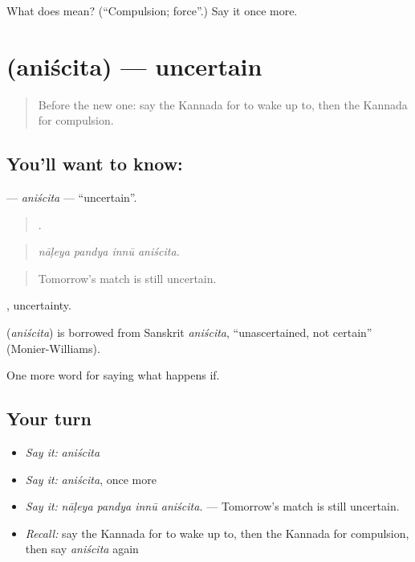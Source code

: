 \begin{tcolorbox}[breakable,colback=teal!4,colframe=teal!35!black,title={Before you move on}]
What does  mean? (\textquotedblleft{}Compulsion; force\textquotedblright{}.) Say it once more.
\end{tcolorbox}
\section[\texorpdfstring{\kn{ಅನಿಶ್ಚಿತ} (aniścita)}{ಅನಿಶ್ಚಿತ (aniścita)}]{ (aniścita) — uncertain}

\label{lesson:KA-C420-aniscita}



\begin{quote}
Before the new one: say the Kannada for to wake up to, then the Kannada for compulsion.
\end{quote}

\subsection*{You'll want to know: }
\textbf{} — \emph{aniścita} — \textquotedblleft{}uncertain\textquotedblright{}.

\begin{quote}
   .
\end{quote}

\begin{quote}
\emph{nāḷeya pandya innū aniścita.}
\end{quote}

\begin{quote}
Tomorrow's match is still uncertain.
\end{quote}

, uncertainty.

\begin{cousinweb}
\textbf{} (\emph{aniścita}) is borrowed from Sanskrit \emph{aniścita}, \textquotedblleft{}unascertained, not certain\textquotedblright{} (Monier-Williams).
\end{cousinweb}

\begin{grammarlens}[title={What you've built}]
One more word for saying what happens if.
\end{grammarlens}

\subsection*{Your turn}
\begin{itemize}
\raggedright
  \item \emph{Say it:} \emph{aniścita}
  \item \emph{Say it:} \emph{aniścita}, once more
  \item \emph{Say it:} \emph{nāḷeya pandya innū aniścita.} — Tomorrow's match is still uncertain.
  \item \emph{Recall:} say the Kannada for to wake up to, then the Kannada for compulsion, then say \emph{aniścita} again
\end{itemize}


